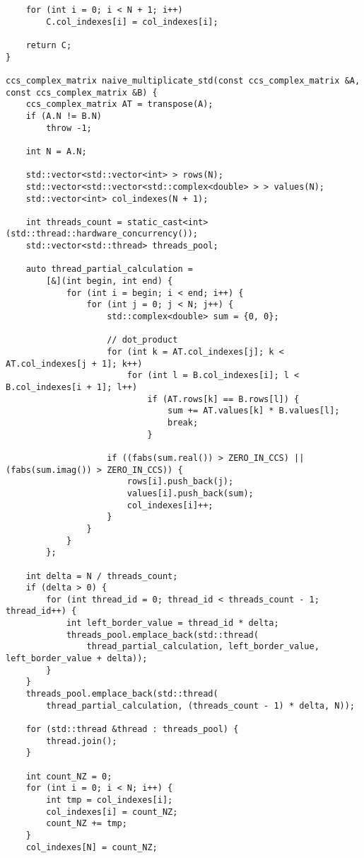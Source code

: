 \documentclass{report}
\begin{document}
\begin{itemize}
\begin{itemize}
\begin{lstlisting}
    for (int i = 0; i < N + 1; i++)
        C.col_indexes[i] = col_indexes[i];

    return C;
}

ccs_complex_matrix naive_multiplicate_std(const ccs_complex_matrix &A, const ccs_complex_matrix &B) {
    ccs_complex_matrix AT = transpose(A);
    if (A.N != B.N)
        throw -1;

    int N = A.N;

    std::vector<std::vector<int> > rows(N);
    std::vector<std::vector<std::complex<double> > > values(N);
    std::vector<int> col_indexes(N + 1);

    int threads_count = static_cast<int>(std::thread::hardware_concurrency());
    std::vector<std::thread> threads_pool;

    auto thread_partial_calculation =
        [&](int begin, int end) {
            for (int i = begin; i < end; i++) {
                for (int j = 0; j < N; j++) {
                    std::complex<double> sum = {0, 0};

                    // dot_product
                    for (int k = AT.col_indexes[j]; k < AT.col_indexes[j + 1]; k++)
                        for (int l = B.col_indexes[i]; l < B.col_indexes[i + 1]; l++)
                            if (AT.rows[k] == B.rows[l]) {
                                sum += AT.values[k] * B.values[l];
                                break;
                            }

                    if ((fabs(sum.real()) > ZERO_IN_CCS) || (fabs(sum.imag()) > ZERO_IN_CCS)) {
                        rows[i].push_back(j);
                        values[i].push_back(sum);
                        col_indexes[i]++;
                    }
                }
            }
        };

    int delta = N / threads_count;
    if (delta > 0) {
        for (int thread_id = 0; thread_id < threads_count - 1; thread_id++) {
            int left_border_value = thread_id * delta;
            threads_pool.emplace_back(std::thread(
                thread_partial_calculation, left_border_value, left_border_value + delta));
        }
    }
    threads_pool.emplace_back(std::thread(
        thread_partial_calculation, (threads_count - 1) * delta, N));

    for (std::thread &thread : threads_pool) {
        thread.join();
    }

    int count_NZ = 0;
    for (int i = 0; i < N; i++) {
        int tmp = col_indexes[i];
        col_indexes[i] = count_NZ;
        count_NZ += tmp;
    }
    col_indexes[N] = count_NZ;


\end{lstlisting}
\end{itemize}
\end{itemize}
\end{document}
